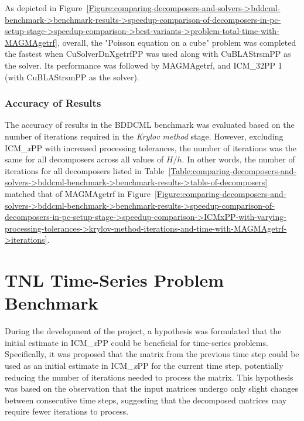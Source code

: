 As depicted in Figure~\ref{Figure:comparing-decomposers-and-solvers->bddcml-benchmark->benchmark-results->speedup-comparison-of-decomposers-in-pc-setup-stage->speedup-comparison->best-variants->problem-total-time-with-MAGMAgetrf}, overall, the "Poisson equation on a cube" problem was completed the fastest when CuSolverDnXgetrfPP was used along with CuBLAStrsmPP as the solver. Its performance was followed by MAGMAgetrf, and ICM\_32PP 1 (with CuBLAStrsmPP as the solver).

\subsubsection{Accuracy of Results} The accuracy of results in the BDDCML benchmark was evaluated based on the number of iterations required in the \textit{Krylov method} stage. However, excluding ICM\_\textit{x}PP with increased processing tolerances, the number of iterations was the same for all decomposers across all values of $H/h$. In other words, the number of iterations for all decomposers listed in Table~\ref{Table:comparing-decomposers-and-solvers->bddcml-benchmark->benchmark-results->table-of-decomposers} matched that of MAGMAgetrf in Figure~\ref{Figure:comparing-decomposers-and-solvers->bddcml-benchmark->benchmark-results->speedup-comparison-of-decomposers-in-pc-setup-stage->speedup-comparison->ICMxPP-with-varying-processing-tolerances->krylov-method-iterations-and-time-with-MAGMAgetrf->iterations}.




\section{TNL Time-Series Problem Benchmark}\label{Section:comparing-decomposers-and-solvers->tnl-time-series-problem-benchmark}
During the development of the project, a hypothesis was formulated that the initial estimate in ICM\_\textit{x}PP could be beneficial for time-series problems. Specifically, it was proposed that the  matrix from the previous time step could be used as an initial estimate in ICM\_\textit{x}PP for the current time step, potentially reducing the number of iterations needed to process the matrix. This hypothesis was based on the observation that the input matrices undergo only slight changes between consecutive time steps, suggesting that the decomposed matrices may require fewer iterations to process.

